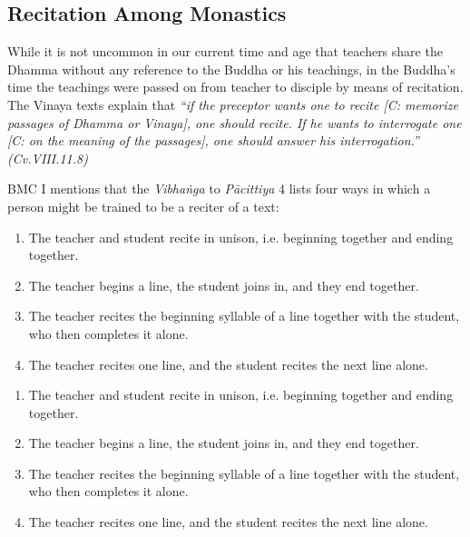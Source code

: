 \subsection*{Recitation Among Monastics}

While it is not uncommon in our current time and age that teachers share the Dhamma without any reference to the Buddha or his teachings, in the Buddha's time the teachings were passed on from teacher to disciple by means of recitation. The Vinaya texts explain that \textit{``if the preceptor wants one to recite [C: memorize passages of Dhamma or Vinaya], one should recite. If he wants to interrogate one [C: on the meaning of the passages], one should answer his interrogation.'' (Cv.VIII.11.8)}

\ifninebythirteen\clearpage\fi

BMC I mentions that the \textit{Vibhaṅga} to \textit{Pācittiya} 4 lists four ways in which a person might be trained to be a reciter of a text:

\ifafive

\begin{enumerate}
  \item The teacher and student recite in unison, i.e. beginning together and ending together.
  \item The teacher begins a line, the student joins in, and they end together.
  \item The teacher recites the beginning syllable of a line together with the student, who then completes it alone.
  \item The teacher recites one line, and the student recites the next line alone.
\end{enumerate}

\fi

\ifninebythirteen

\begin{enumerate}
  \item The teacher and student recite in unison, i.e. beginning together and ending together.
  \item The teacher begins a line, the student joins in, and they end together.
  \item The teacher recites the beginning syllable of a line together with the student, who then completes it alone.
  \item The teacher recites one line, and the student recites the next line alone.
\end{enumerate}

\fi

